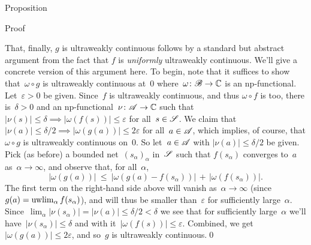 \documentclass[a]{subfiles}
\begin{document}
\begin{parsec}
\begin{point}[vn-extension]{Proposition}
\begin{point}{Proof}
\begin{point}
That, finally, $g$ is ultraweakly continuous
follows by a standard but abstract argument from the fact
that $f$ is \emph{uniformly} ultraweakly continuous.
We'll give a concrete version of this argument here.
To begin, note that it suffices to show that~$\omega\circ g$
is ultraweakly continuous
at~$0$
where~$\omega\colon \mathscr{B}\to\mathbb{C}$
is an np-functional.
Let~$\varepsilon>0$ be given.
Since~$f$ 
is ultraweakly continuous,
and 
thus $\omega\circ f$ is too,
there is~$\delta>0$ and an np-functional~$\nu\colon \mathscr{A}\to\mathbb{C}$
such that $\left|\nu(s)\right|\leq \delta \implies 
\left|\omega(f(s))\right|\leq \varepsilon$
for all~$s\in\mathscr{S}$.
We claim that $\left|\nu(a)\right|\leq \delta/2 \implies
\left|\omega(g(a))\right|\leq 2\varepsilon$
for all~$a\in\mathscr{A}$,
which implies, of course,
that $\omega\circ g$ is ultraweakly continuous on~$0$.
So let~$a\in\mathscr{A}$ with $\left|\nu(a)\right|\leq \delta/2$
be given.
Pick (as before) a bounded net~$(s_\alpha)_\alpha$
in~$\mathscr{S}$
such that $f(s_\alpha)$
converges to~$a$ as~$\alpha\to\infty$, and observe that,
for all~$\alpha$,
\begin{equation*}
\left|\omega(g (a))\right|
\ \leq\ 
\left|\omega(g(a)-f(s_\alpha))\right|
\,+\,\left|\omega(f(s_\alpha))\right|.
\end{equation*}
The first term on the right-hand side above will 
vanish as~$\alpha\to\infty$ (since 
$g (a)=\uwlim_\alpha f (s_\alpha)$),
and will thus be smaller than~$\varepsilon$ 
for sufficiently large~$\alpha$.
Since~$\lim_\alpha \left|\nu(s_\alpha)\right|=\left|\nu(a)\right|
\leq \delta/2<\delta$
we see 
that for sufficiently large~$\alpha$
we'll have~$\left|\nu(s_\alpha)\right|\leq \delta$ 
and with it~$\left|\omega(f (s))\right|\leq \varepsilon$.
Combined,
we get $\left|\omega(g (a))\right|\leq 2\varepsilon$,
and so~$g$ is ultraweakly continuous.\qed
\end{point}

\end{point}
\end{point}
\end{parsec}
\end{document}
